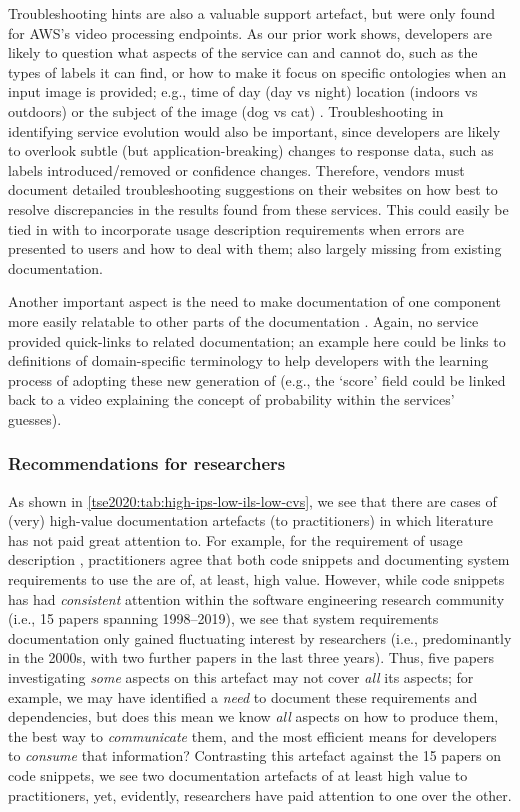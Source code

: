 Troubleshooting hints  are also a valuable support artefact, but were only found for AWS's video processing endpoints. As our prior work shows, developers are likely to question what aspects of the service can and cannot do, such as the types of labels it can find, or how to make it focus on specific ontologies when an input image is provided; e.g., time of day (day vs night) location (indoors vs outdoors) or the subject of the image (dog vs cat) \citep{Cummaudo:2020icse}. Troubleshooting in identifying service evolution \citep{Cummaudo:2020icse} would also be important, since developers are likely to overlook subtle (but application-breaking) changes to response data, such as labels introduced/removed or confidence changes. Therefore, vendors must document detailed troubleshooting suggestions on their websites on how best to resolve discrepancies in the results found from these services. This could easily be tied in with  to incorporate usage description requirements when errors are presented to users and how to deal with them; also largely missing from existing documentation.

Another important aspect is the need to make documentation of one component more easily relatable to other parts of the documentation . Again, no service provided quick-links to related documentation; an example here could be links to definitions of domain-specific terminology  to help developers with the learning process of adopting these new generation of  (e.g., the `score' field could be linked back to a video explaining the concept of probability within the services' guesses).

\subsubsection{Recommendations for researchers}
As shown in \cref{tse2020:tab:high-ips-low-ils-low-cvs}, we see that there are cases of (very) high-value documentation artefacts (to practitioners) in which literature has not paid great attention to. For example, for the requirement of  usage description , practitioners agree that both code snippets  and documenting system requirements to use the   are of, at least, high value. However, while code snippets has had \textit{consistent} attention within the software engineering research community (i.e., 15 papers spanning 1998--2019), we see that system requirements documentation only gained fluctuating interest by researchers (i.e., predominantly in the 2000s, with two further papers in the last three years). Thus, five papers investigating \textit{some} aspects on this artefact may not cover \textit{all} its aspects; for example, we may have identified a \textit{need} to document these requirements and dependencies, but does this mean we know \textit{all} aspects on how to produce them, the best way to \textit{communicate} them, and the most efficient means for developers to \textit{consume} that information? Contrasting this artefact against the 15 papers on code snippets, we see two documentation artefacts of at least high value to practitioners, yet, evidently, researchers have paid attention to one over the other.

